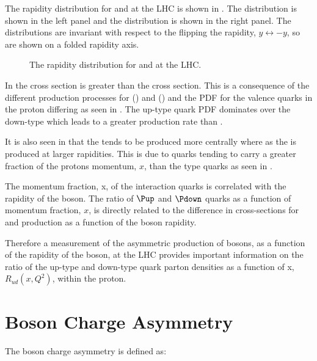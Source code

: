 The rapidity distribution for \PWp and \PWm at the \ac{LHC} is shown in
. 
The \PWm distribution is shown in the left panel and the \PWp distribution is
shown in the right panel. The distributions are invariant with respect to the
flipping the rapidity, $y\leftrightarrow-y$, so are shown on a folded rapidity
axis.

\begin{figure}[htb]
  \centering
  \caption{The rapidity distribution for \PWp and \PWm at the LHC.}
  \label{wbos:wrapid}
\end{figure}

In  the \PWp cross section is greater than the \PWm
cross section. This is a consequence of the different production processes for
\PWp () and \PWm () and the
\ac{PDF} for the valence quarks in the proton differing as seen in
. The up-type quark \ac{PDF} dominates over the
down-type which leads to a greater \PWp production rate than \PWm.

It is also seen in  that the \PWm tends to be produced
more centrally where as the \PWp is produced at larger rapidities. This is due
to \Pup quarks tending to carry a greater fraction of the protons momentum,
$x$, than the \Pdown type quarks as seen in .

The momentum fraction, x, of the interaction quarks is correlated
with the rapidity of the \PW boson. The ratio of $\Pup$ and $\Pdown$ quarks as
a function of momentum fraction, $x$, is directly related to the difference in
cross-sections for \PWp and \PWm production as a function of the boson
rapidity.

Therefore a measurement of the asymmetric production of \PW bosons, as a
function of the rapidity of the boson, at the \ac{LHC} provides important
information on the ratio of the up-type and down-type quark parton densities as
a function of x,
$R_{ud}(x,Q^2)$, within the proton. 

\section{\PW Boson Charge Asymmetry}

The \PWpm boson charge asymmetry is defined as:

